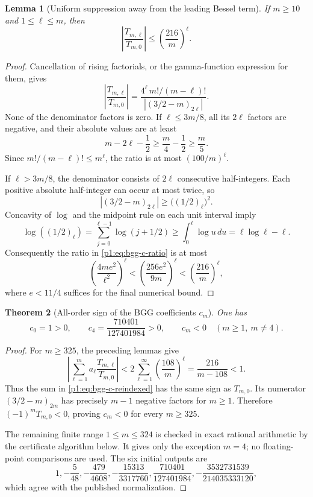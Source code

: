 \documentclass[11pt,a4paper]{article}
\newtheorem{theorem}{Theorem}[section]
\newtheorem{lemma}[theorem]{Lemma}
\theoremstyle{definition}
\theoremstyle{remark}
\numberwithin{equation}{section}
\begin{document}
\begin{lemma}[Uniform suppression away from the leading Bessel term]
If $m\geq10$ and $1\leq\ell\leq m$, then
\[
 \left|\frac{T_{m,\ell}}{T_{m,0}}\right|
 \leq\left(\frac{216}{m}\right)^\ell.
\]
\end{lemma}
\begin{proof}
Cancellation of rising factorials, or the gamma-function expression for
them, gives
\begin{equation}\label{p1:eq:bgg-c-ratio}
 \left|\frac{T_{m,\ell}}{T_{m,0}}\right|
 =\frac{4^\ell\,m!/(m-\ell)!}
 {|(3/2-m)_{2\ell}|}.
\end{equation}
None of the denominator factors is zero.
If $\ell\leq3m/8$, all its $2\ell$ factors are negative, and their
absolute values are at least
\[
 m-2\ell-\frac12\geq\frac m4-\frac12\geq\frac m5.
\]
Since $m!/(m-\ell)!\leq m^\ell$, the ratio is at most
$(100/m)^\ell$.

If $\ell>3m/8$, the denominator consists of $2\ell$ consecutive
half-integers. Each positive absolute half-integer can occur at most
twice, so
\[
 |(3/2-m)_{2\ell}|\geq\bigl((1/2)_\ell\bigr)^2.
\]
Concavity of $\log$ and the midpoint rule on each unit interval imply
\[
 \log((1/2)_\ell)=\sum_{j=0}^{\ell-1}\log(j+1/2)
 \geq\int_0^\ell\log u\,du=\ell\log\ell-\ell.
\]
Consequently the ratio in \eqref{p1:eq:bgg-c-ratio} is at most
\[
 \left(\frac{4me^2}{\ell^2}\right)^\ell
 <\left(\frac{256e^2}{9m}\right)^\ell
 <\left(\frac{216}{m}\right)^\ell,
\]
where $e<11/4$ suffices for the final numerical bound.
\end{proof}

\begin{theorem}[All-order sign of the BGG coefficients $c_m$]
One has
\[
 c_0=1>0,\qquad c_4=\frac{710401}{127401984}>0,
 \qquad c_m<0\quad(m\geq1,\ m\ne4).
\]
\end{theorem}
\begin{proof}
For $m\geq325$, the preceding lemmas give
\[
 \left|\sum_{\ell=1}^m a_\ell
 \frac{T_{m,\ell}}{T_{m,0}}\right|
 <2\sum_{\ell=1}^{\infty}\left(\frac{108}{m}\right)^\ell
 =\frac{216}{m-108}<1.
\]
Thus the sum in \eqref{p1:eq:bgg-c-reindexed} has the same sign as
$T_{m,0}$. Its numerator $(3/2-m)_{2m}$ has precisely $m-1$ negative
factors for $m\geq1$. Therefore $(-1)^mT_{m,0}<0$, proving $c_m<0$
for every $m\geq325$.

The remaining finite range $1\leq m\leq324$ is checked in exact rational
arithmetic by the certificate algorithm below. It gives only the exception
$m=4$; no floating-point comparisons are used. The six initial outputs are
\[
 1,-\frac5{48},-\frac{479}{4608},-\frac{15313}{3317760},
 \frac{710401}{127401984},-\frac{3532731539}{214035333120},
\]
which agree with the published normalization.
\end{proof}
\end{document}
